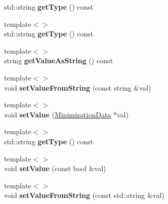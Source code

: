 \begin{DoxyCompactItemize}
\item 
\hypertarget{classrr_1_1_parameter_ab1ed322d63757591a697be37ca0a95bd}{std\-::string {\bfseries get\-Type} () const }\label{classrr_1_1_parameter_ab1ed322d63757591a697be37ca0a95bd}

\item 
\hypertarget{classrr_1_1_parameter_afa79c5fdbeae88aee0c0003aae68b2e9}{{\footnotesize template$<$$>$ }\\std\-::string {\bfseries get\-Type} () const}\label{classrr_1_1_parameter_afa79c5fdbeae88aee0c0003aae68b2e9}

\item 
\hypertarget{classrr_1_1_parameter_aa39a7658f34f17ea73cfc6d7c520b58a}{{\footnotesize template$<$$>$ }\\string {\bfseries get\-Value\-As\-String} () const}\label{classrr_1_1_parameter_aa39a7658f34f17ea73cfc6d7c520b58a}

\item 
\hypertarget{classrr_1_1_parameter_a6cca50d88bc36dafdec052d08db78f16}{{\footnotesize template$<$$>$ }\\void {\bfseries set\-Value\-From\-String} (const string \&val)}\label{classrr_1_1_parameter_a6cca50d88bc36dafdec052d08db78f16}

\item 
\hypertarget{classrr_1_1_parameter_a906f348495361c66809733603425b672}{{\footnotesize template$<$$>$ }\\void {\bfseries set\-Value} (\hyperlink{classrr_1_1_minimization_data}{Minimization\-Data} $\ast$val)}\label{classrr_1_1_parameter_a906f348495361c66809733603425b672}

\item 
\hypertarget{classrr_1_1_parameter_a8fcd033a8d6b4d40ab81ba34c822dc78}{{\footnotesize template$<$$>$ }\\std\-::string {\bfseries get\-Type} () const}\label{classrr_1_1_parameter_a8fcd033a8d6b4d40ab81ba34c822dc78}

\item 
\hypertarget{classrr_1_1_parameter_ae52d07e8315fa71d209cafeca6a7ca7a}{{\footnotesize template$<$$>$ }\\void {\bfseries set\-Value} (const bool \&val)}\label{classrr_1_1_parameter_ae52d07e8315fa71d209cafeca6a7ca7a}

\item 
\hypertarget{classrr_1_1_parameter_a35cc4b28d159c46875e802e6a3ae8b03}{{\footnotesize template$<$$>$ }\\void {\bfseries set\-Value\-From\-String} (const std\-::string \&val)}\label{classrr_1_1_parameter_a35cc4b28d159c46875e802e6a3ae8b03}


\end{DoxyCompactItemize}
